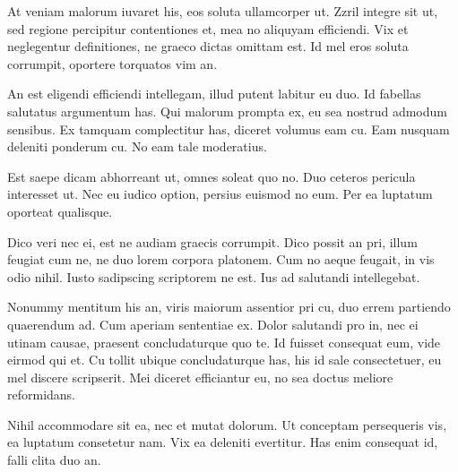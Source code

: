 At veniam malorum iuvaret his, eos soluta ullamcorper ut. Zzril integre sit ut, sed regione percipitur contentiones et, mea no aliquyam efficiendi. Vix et neglegentur definitiones, ne graeco dictas omittam est. Id mel eros soluta corrumpit, oportere torquatos vim an.

An est eligendi efficiendi intellegam, illud putent labitur eu duo. Id fabellas salutatus argumentum has. Qui malorum prompta ex, eu sea nostrud admodum sensibus. Ex tamquam complectitur has, diceret volumus eam cu. Eam nusquam deleniti ponderum cu. No eam tale moderatius.

Est saepe dicam abhorreant ut, omnes soleat quo no. Duo ceteros pericula interesset ut. Nec eu iudico option, persius euismod no eum. Per ea luptatum oporteat qualisque.

Dico veri nec ei, est ne audiam graecis corrumpit. Dico possit an pri, illum feugiat cum ne, ne duo lorem corpora platonem. Cum no aeque feugait, in vis odio nihil. Iusto sadipscing scriptorem ne est. Ius ad salutandi intellegebat.

Nonummy mentitum his an, viris maiorum assentior pri cu, duo errem partiendo quaerendum ad. Cum aperiam sententiae ex. Dolor salutandi pro in, nec ei utinam causae, praesent concludaturque quo te. Id fuisset consequat eum, vide eirmod qui et. Cu tollit ubique concludaturque has, his id sale consectetuer, eu mel discere scripserit. Mei diceret efficiantur eu, no sea doctus meliore reformidans.

Nihil accommodare sit ea, nec et mutat dolorum. Ut conceptam persequeris vis, ea luptatum consetetur nam. Vix ea deleniti evertitur. Has enim consequat id, falli clita duo an.
